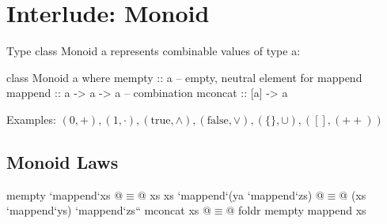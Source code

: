 \section{Interlude: Monoid}

Type class Monoid a represents combinable values of type a:

\begin{Haskell}
class Monoid a where
   mempty :: a -- empty, neutral element for mappend
   mappend :: a -> a -> a -- combination
   mconcat :: [a] -> a
\end{Haskell}

Examples: $(0, +), (1, \cdot), (\text{true}, \land), (\text{false}, \lor), (\{\}, \cup), ([], (++))$

\subsection{Monoid Laws}
\begin{Haskell}
mempty `mappend`xs @$\equiv$@ xs
xs `mappend`(ya `mappend`zs) @$\equiv$@ (xs `mappend`ys) `mappend`zs``
mconcat xs @$\equiv$@ foldr mempty mappend xs
\end{Haskell}